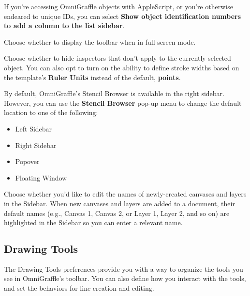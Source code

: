 \documentclass[../main.tex]{subfiles}
\begin{document}
\begin{ogpro}
  \begin{description}[style=nextline]
    \item[{Object ID Numbers (\textbf{PRO})}] If you're accessing OmniGraffle objects with
      AppleScript, or you're otherwise endeared to unique IDs, you can select \textbf{Show
      object identification numbers to add a column to the list sidebar}.
  \end{description}
\end{ogpro}

\begin{description}[style=nextline]
  \item[{Full Screen}] Choose whether to display the toolbar when in full screen mode.
  \item[{Inspectors}] Choose whether to hide inspectors that don't apply to the currently
    selected object. You can also opt to turn on the ability to define stroke widths based on
    the template's \textbf{Ruler Units} instead of the default, \textbf{points}.
  \item[{Stencil Browser}] By default, OmniGraffle's Stencil Browser is available in the right
    sidebar. However, you can use the \textbf{Stencil Browser} pop-up menu to change the default
    location to one of the following:

    \begin{itemize}
      \item Left Sidebar
      \item Right Sidebar
      \item Popover
      \item Floating Window
    \end{itemize}
  \item[{Sidebar}] Choose whether you'd like to edit the names of newly-created canvases and
    layers in the Sidebar. When new canvases and layers are added to a document, their default
    names (e.g., Canvas 1, Canvas 2, or Layer 1, Layer 2, and so on) are highlighted in the
    Sidebar so you can enter a relevant name.
\end{description}

\subsection{Drawing Tools}

The Drawing Tools preferences provide you with a way to organize the tools you see in
OmniGraffle's toolbar. You can also define how you interact with the tools, and set the
behaviors for line creation and editing.
\end{document}
